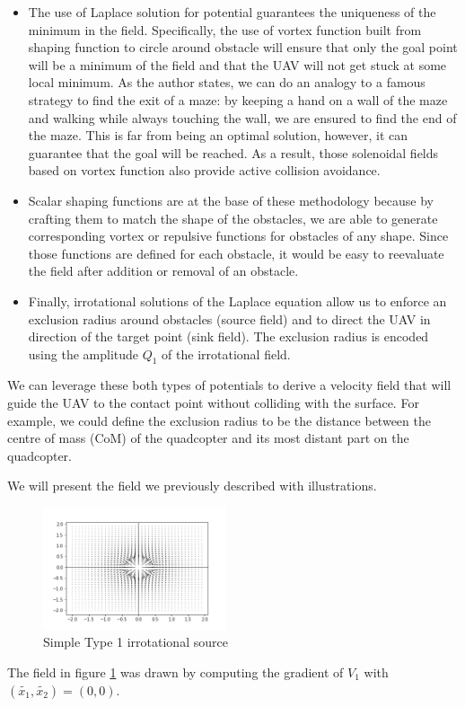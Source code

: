 \begin{itemize}
    \item The use of Laplace solution for potential guarantees the uniqueness of the minimum in the field. 
    Specifically, the use of vortex function built from shaping function to circle around obstacle will
    ensure that only the goal point will be a minimum of the field and that the UAV will not get stuck at some local minimum. 
    As the author states, we can do an analogy to a famous strategy to find the exit of a maze: 
    by keeping a hand on a wall of the maze and walking while always touching the wall, we are ensured to find the end of the maze. 
    This is far from being an optimal solution, however, it can guarantee that the goal will be reached. 
    As a result, those solenoidal fields based on vortex function also provide active collision avoidance. 
    \item Scalar shaping functions are at the base of these methodology because by crafting them to match the shape of the obstacles, 
    we are able to generate corresponding vortex or repulsive functions for obstacles of any shape. 
    Since those functions are defined for each obstacle, it would be easy to reevaluate the field after addition or removal of an obstacle.
    \item Finally, irrotational solutions of the Laplace equation allow us to enforce an exclusion radius around obstacles (source field) and to direct the UAV in direction of the target point (sink field).
    The exclusion radius is encoded using the amplitude ${Q}_{1}$ of the irrotational field.
\end{itemize}

We can leverage these both types of potentials to derive a velocity field that will guide the UAV to the contact point without colliding with the surface.
For example, we could define the exclusion radius to be the distance between the centre of mass (CoM) of the quadcopter and its most distant part on the quadcopter. 

We will present the field we previously described with illustrations. 
\begin{figure}[h!]
    \centering
    \includegraphics[width=0.48\textwidth]{Images/simplesource.png}
    \caption{Simple Type 1 irrotational source}
    \label{fig:simplesource}
\end{figure}
The field in figure \ref{fig:simplesource} was drawn by computing the gradient of $V_1$ with $(\tilde{{x}_{1}}, \tilde{{x}_{2}}) = (0,0)$.

